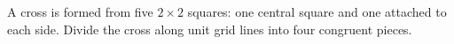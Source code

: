 A cross is formed from five $2\times2$ squares: one central square and one attached to each side. Divide the cross along unit grid lines into four congruent pieces.
